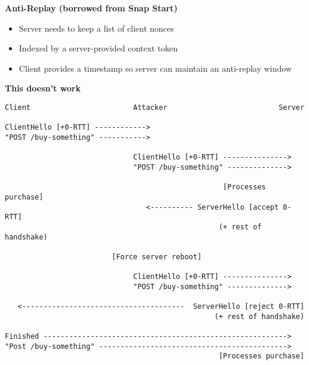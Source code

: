 \documentclass[helvetica]{seminar}
\newcommand{\heading}[1]{%
  \begin{center} 
    \large\bf 
    #1 
  \end{center} 
  \vspace{.4 in}}
\begin{document}
\begin{slide}
\heading{Anti-Replay (borrowed from Snap Start)}

\begin{itemize}
\item Server needs to keep a list of client nonces
\item Indexed by a server-provided context token
\item Client provides a timestamp so server can maintain an anti-replay window
\end{itemize}
\end{slide}


\begin{slide}
\heading{This doesn't work}

\vspace{-.45in}
{\scriptsize
\begin{verbatim}
Client                        Attacker                          Server

ClientHello [+0-RTT] ------------>
"POST /buy-something" ----------->      

                              ClientHello [+0-RTT] --------------->
                              "POST /buy-something" -------------->      
                           
                                                   [Processes purchase]
                                 <---------- ServerHello [accept 0-RTT]
                                                  (+ rest of handshake)

                         [Force server reboot]

                              ClientHello [+0-RTT] --------------->
                              "POST /buy-something" -------------->      

   <--------------------------------------  ServerHello [reject 0-RTT]
                                                 (+ rest of handshake)

Finished --------------------------------------------------------->
"Post /buy-something" -------------------------------------------->
                                                  [Processes purchase]
\end{verbatim}
}
\end{slide}
\end{document}

